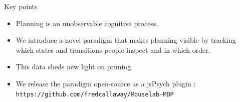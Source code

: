 \documentclass[final]{beamer}
\newlength{\sepwid}
\newlength{\onecolwid}
\begin{document}
\begin{frame}[t, fragile] %
\begin{columns}[t] %
\begin{column}{\sepwid}\end{column} %


\begin{column}{\onecolwid} %
  \begin{block}{Key points}\label{contribution}
    \begin{itemize}
      \item Planning is an unobservable cognitive process.
      \item We introduce a novel paradigm that makes planning visible by tracking which states and transitions people inspect and in which order.
      \item This data sheds new light on pruning.
      \item We release the paradigm open-source as a jsPsych plugin \cite{DeLeeuw2015}: \texttt{https://github.com/fredcallaway/Mouselab-MDP}
    \end{itemize}
  \end{block}



\end{column}
\end{columns}
\end{frame}
\end{document}
